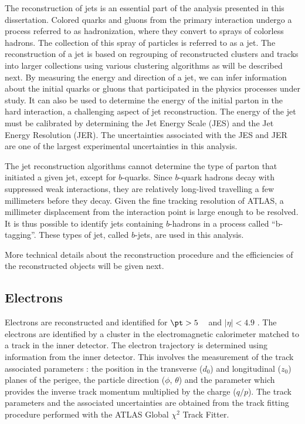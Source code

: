 The reconstruction of jets is an essential part of the analysis presented in this dissertation. 
Colored quarks and gluons from the primary interaction  undergo a process referred to as hadronization,
where they convert to sprays of colorless hadrons. The collection of this spray of particles is 
referred to as a jet. 
The reconstruction of a jet is based on regrouping of reconstructed clusters and tracks into larger collections using
various clustering algorithms as will be described next.
By measuring the energy and direction of a jet, we can infer information 
about the initial quarks or gluons that participated in the physics processes under study.
It can also be used to determine the energy of the initial parton in the hard interaction, 
a challenging aspect of jet reconstruction.
The energy of the jet must be calibrated by determining the 
Jet Energy Scale (JES) and the Jet Energy Resolution (JER).%
The uncertainties associated with the JES and JER are one of the largest 
experimental uncertainties in this analysis.

The jet reconstruction algorithms cannot determine the type of parton that initiated a
given jet, except for $b$-quarks.
Since $b$-quark hadrons decay with suppressed weak interactions, they are 
relatively long-lived travelling a few millimeters before they decay.
Given the fine tracking resolution of ATLAS, 
a millimeter displacement from the interaction point is large enough to be resolved.
It is thus possible to identify jets containing $b$-hadrons  in a process called ``b-tagging''.
These types of jet, called $b$-jets, are used in this analysis.

More technical details about the reconstruction procedure and the efficiencies 
of the reconstructed objects will be given next.

\subsection{Electrons}
Electrons are reconstructed and identified for $\pt > 5$ \GeV~ and
 $|\eta| < 4.9$ \cite{ATLAS-CONF-2016-024}.
The electrons  are identified by a cluster in the electromagnetic calorimeter 
matched to a track in the inner detector.
The electron trajectory is determined using information from the inner detector. This involves the measurement of the track associated parameters : the
position in the transverse ($d_0$) and longitudinal ($z_0$) planes of the perigee, the particle direction ($\phi$, $\theta$)
and the parameter which provides the inverse track momentum multiplied by the charge ($q/p$). The track
parameters and the associated uncertainties are obtained from the track fitting procedure performed with
the ATLAS Global $\chi^2$ Track Fitter.


